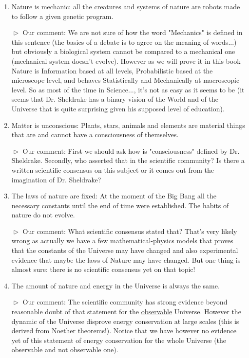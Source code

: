 	\begin{enumerate}
		\item \og Nature is mechanic: all the creatures and systems of nature are robots made to follow a given genetic program. \fg{}
		
		$\vartriangleright$ Our comment: We are not sure of how the word "Mechanics" is defined in this sentence (the basics of a debate is to agree on the meaning of words...) but obviously a biological system cannot be compared to a mechanical one (mechanical system doesn't evolve). However as we will prove it in this book Nature is Information based at all levels, Probabilistic based at the microscope level, and behaves Statistically and Mechanically at macroscopic level. So as most of the time in Science..., it's not as easy as it seems to be (it seems that Dr. Sheldrake has a binary vision of the World and of the Universe that is quite surprising given his supposed level of education).
		
		\item \og Matter is unconscious: Plants, stars, animals and elements are material things that are and cannot have a consciousness of themselves. \fg{}
		
		$\vartriangleright$ Our comment: First we should ask how is "consciousness" defined by Dr. Sheldrake. Secondly, who asserted that in the scientific community? Is there a written scientific consensus on this subject or it comes out from the imagination of Dr. Sheldrake?

		\item \og The laws of nature are fixed: At the moment of the Big Bang all the necessary constants until the end of time were established. The habits of nature do not evolve. \fg{}
		
		$\vartriangleright$ Our comment: What scientific consensus stated that? That's very likely wrong as actually we have a few mathematical-physics models that proves that the constants of the Universe may have changed and also experimental evidence that maybe the laws of Nature may have changed. But one thing is almost sure: there is no scientific consensus yet on that topic!

		\item \og The amount of nature and energy in the Universe is always the same. \fg{}
		
		$\vartriangleright$ Our comment: The scientific community has strong evidence beyond reasonable doubt of that statement for the \underline{observable} Universe. However the dynamic of the Universe disprove energy conservation at large scales (this is derived from Noether theorems!). Notice that we have however no evidence yet of this statement of energy conservation for the whole Universe (the observable and not observable one).


\end{enumerate}
